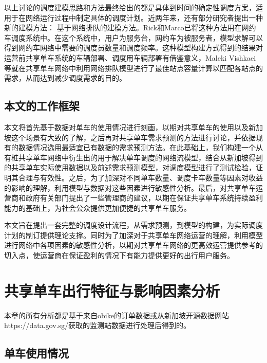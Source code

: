 \documentclass[]{tongjithesis}
\numberwithin{equation}{chapter}
\begin{document}
以上讨论的调度建模思路和方法最终给出的都是具体到时间的确定性调度方案，适用于在网络运行过程中制定具体的调度计划。近两年来，还有部分研究者提出一种新的建模方法： 基于网络排队的建模方法。Rick和Marco已将这种方法用在网约车调度系统中\cite{zhang2015queueing}。在这个系统中，用户为服务台，网约车为被服务者，模型求解可以得到网约车网络中需要的调度员数量和调度频率。这种模型构建方式得到的结果对运营前共享单车系统的车辆部署、调度用车辆部署有借鉴意义，Maleki Vishkaei等就在共享单车网络中利用网络排队模型进行了最佳站点容量计算以匹配各站点的需求，从而达到减少调度需求的目的\cite{vishkaei2020balancing}。

\section{本文的工作框架}
本文将首先基于数据对单车的使用情况进行刻画，以期对共享单车的使用以及新加坡这个场景有大致的了解，之后再对共享单车需求预测的方法进行讨论，并依据现有的数据情况选用最适宜已有数据的需求预测方法。在此基础上，我们构建一个从有桩共享单车网络中衍生出的用于解决单车调度的网络流模型，结合从新加坡得到的共享单车实际使用数据以及前述需求预测模型，对调度模型进行了测试检验，证明其合理与有效性。之后，为了加深对不同单车数量、调度卡车数量等因素对收益的影响的理解，利用模型与数据对这些因素进行敏感性分析。最后，对共享单车运营商和政府有关部门提出了一些管理商的建议，以期在保证共享单车系统持续盈利能力的基础上，为社会公众提供更加便捷的共享单车服务。

本文旨在提出一套完整的调度设计流程，从需求预测，到模型的构建，为实际调度计划的制订提供理论支撑。同时为了加深对于共享单车网络运营的理解，利用模型进行网络中各项因素的敏感性分析，以期对共享单车网络的更高效运营提供参考的切入点，使运营商在保证盈利的情况下有能力提供更好的出行用户服务。

\clearpage
\chapter{共享单车出行特征与影响因素分析}
本章的所有分析都是基于来自obike的订单数据或从新加坡开源数据网站https://data.gov.sg/获取的监测站数据进行处理后得到的。
\section{单车使用情况}
\end{document}
